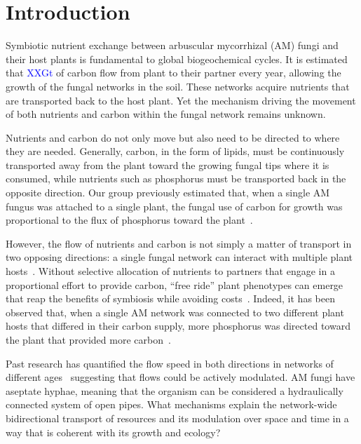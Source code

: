 \section*{Introduction}

Symbiotic nutrient exchange between arbuscular mycorrhizal (AM) fungi and their host plants is fundamental to global biogeochemical cycles. It is estimated that \textcolor{blue}{XXGt} of carbon flow from plant to their partner every year, allowing the growth of the fungal networks in the soil. These networks acquire nutrients that are transported back to the host plant. Yet the mechanism driving the movement of both nutrients and carbon within the fungal network remains unknown. 

Nutrients and carbon do not only move but also need to be directed to where they are needed. Generally, carbon, in the form of lipids, must be continuously transported away from the plant toward the growing fungal tips where it is consumed, while nutrients such as phosphorus must be transported back in the opposite direction. Our group previously estimated that, when a single AM fungus was attached to a single plant, the fungal use of carbon for growth was proportional to the flux of phosphorus toward the plant~\cite{bisot_carbon-phosphorous_2025}.

However, the flow of nutrients and carbon is not simply a matter of transport in two opposing directions: a single fungal network can interact with multiple plant hosts~\cite{kiers_reciprocal_2011,walder_mycorrhizal_2012}.
Without selective allocation of nutrients to partners that engage in a proportional effort to provide carbon, ``free ride'' plant phenotypes can emerge that reap the benefits of symbiosis while avoiding costs~\cite{kiers_reciprocal_2011,bever_preferential_2009,walder_regulation_2015,noe_mycorrhizal_2018,kiers_misconceptions_2016}. Indeed, it has been observed that, when a single AM network was connected to two different plant hosts that differed in their carbon supply, more phosphorus was directed toward the plant that provided more carbon~\cite{kiers_reciprocal_2011}. 

Past research has quantified the flow speed in both directions in networks of different ages~\cite{oyarte_galvez_travelling-wave_2025} suggesting that flows could be actively modulated. AM fungi have aseptate hyphae, meaning that the organism can be considered a hydraulically connected system of open pipes. What mechanisms explain the network-wide bidirectional transport of resources and its modulation over space and time in a way that is coherent with its growth and ecology?

